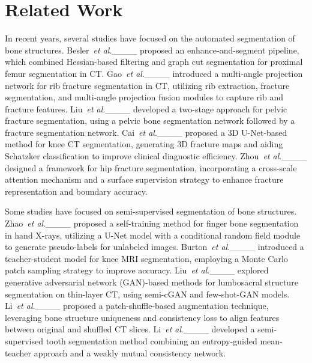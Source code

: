 \section{Related Work}
In recent years, several studies have focused on the automated segmentation of bone structures.
Besler~\textit{et al}.____ proposed an enhance-and-segment pipeline, which combined Hessian-based filtering and graph cut segmentation for proximal femur segmentation in CT.
Gao~\textit{et al}.____ introduced a multi-angle projection network for rib fracture segmentation in CT, utilizing rib extraction, fracture segmentation, and multi-angle projection fusion modules to capture rib and fracture features.
Liu~\textit{et al}.____ developed a two-stage approach for pelvic fracture segmentation, using a pelvic bone segmentation network followed by a fracture segmentation network.
Cai~\textit{et al}.____ proposed a 3D U-Net-based method for knee CT segmentation, generating 3D fracture maps and aiding Schatzker classification to improve clinical diagnostic efficiency.
Zhou~\textit{et al}.____ designed a framework for hip fracture segmentation, incorporating a cross-scale attention mechanism and a surface supervision strategy to enhance fracture representation and boundary accuracy.

Some studies have focused on semi-supervised segmentation of bone structures.
Zhao~\textit{et al}.____ proposed a self-training method for finger bone segmentation in hand X-rays, utilizing a U-Net model with a conditional random field module to generate pseudo-labels for unlabeled images.
Burton~\textit{et al}.____ introduced a teacher-student model for knee MRI segmentation, employing a Monte Carlo patch sampling strategy to improve accuracy.
Liu~\textit{et al}.____ explored generative adversarial network (GAN)-based methods for lumbosacral structure segmentation on thin-layer CT, using semi-cGAN and few-shot-GAN models.
Li~\textit{et al}.____ proposed a patch-shuffle-based augmentation technique, leveraging bone structure uniqueness and consistency loss to align features between original and shuffled CT slices.
Li~\textit{et al}.____ developed a semi-supervised tooth segmentation method combining an entropy-guided mean-teacher approach and a weakly mutual consistency network.
